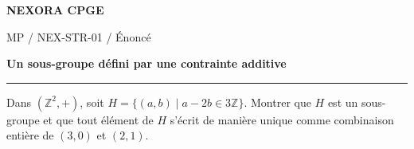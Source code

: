 \documentclass[11pt,a4paper]{article}
\begin{document}
{\small\bfseries\color{nexorablue} NEXORA CPGE}\par
{\small MP / NEX-STR-01 / Énoncé}\par
{\LARGE\bfseries Un sous-groupe défini par une contrainte additive}\par
\vspace{0.25em}\hrule\vspace{0.6em}

Dans $(\mathbb Z^2,+)$, soit $H=\{(a,b)\mid a-2b\in3\mathbb Z\}$. Montrer que $H$ est un sous-groupe et que tout élément de $H$ s’écrit de manière unique comme combinaison entière de $(3,0)$ et $(2,1)$.
\end{document}
